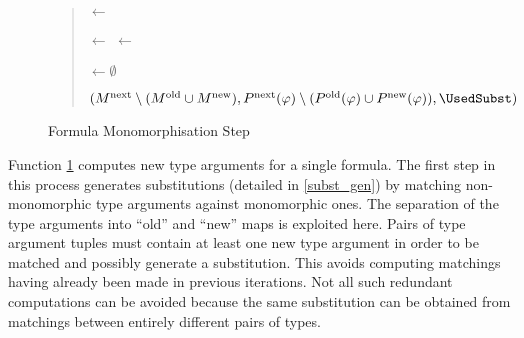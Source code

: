 \documentclass[]{ceurart}
\begin{document}
\begin{figure}
\begin{quote}
\begin{algorithm}[H]
{   \TypeVars \(\leftarrow\) \TyVars{\(\varphi\)}\;

   \textcolor{ourblueviolet}{
   \MaxMono \(\leftarrow\) \;
   \MaxPoly \(\leftarrow\) \;
   }

   \BlankLine

   \UsedSubst \(\leftarrow\emptyset\)\;
   \BlankLine

   \Return \((M^{\text{next}}\setminus (M^\text{old} \cup M^\text{new}), P^{\text{next}}(\varphi)\setminus (P^\text{old}(\varphi)\cup P^\text{new}(\varphi)), \UsedSubst)\)
}

\end{algorithm}
\end{quote}
\caption{Formula Monomorphisation Step}
\label{mono_step}
\end{figure}

Function \ref{mono_step} computes new type arguments for a single formula. The first step in this process generates substitutions (detailed in \ref{subst_gen}) by matching non-monomorphic type arguments against monomorphic ones. The separation of the type arguments into ``old'' and ``new'' maps is exploited here. Pairs of type argument tuples must contain at least one new type argument in order to be matched and possibly generate a substitution. This avoids computing matchings having already been made in previous iterations. Not all such redundant computations can be avoided because the same substitution can be obtained from matchings between entirely different pairs of types.
\end{document}
